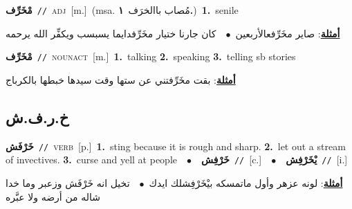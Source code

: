 \documentclass[10pt,a4paper,twoside]{article} %
\begin{document}
\begin{multicols}{2}
{\setlength\topsep{0pt}\textbf{\foreignlanguage{arabic}{مْخَرِّف}}\ {\color{gray}\texttt{//}\color{black}}\ \textsc{adj}\ [m.]\ \color{gray}(msa. \foreignlanguage{arabic}{مُصاب باالخرَف}~\foreignlanguage{arabic}{\textbf{١.}})\color{black}\ \textbf{1.}~senile\  \begin{flushright}\color{gray}\foreignlanguage{arabic}{\textbf{\underline{\foreignlanguage{arabic}{أمثلة}}}: صاير مخَرِّفعالأربعين\ $\bullet$\ \  كان جارنا ختيار مخَرِّفدايما يسبسب ويكفِّر الله يرحمه}\end{flushright}\color{black}} \vspace{2mm}

{\setlength\topsep{0pt}\textbf{\foreignlanguage{arabic}{مْخَرِّف}}\ {\color{gray}\texttt{//}\color{black}}\ \textsc{noun\textunderscore act}\ [m.]\ \textbf{1.}~talking  \textbf{2.}~speaking  \textbf{3.}~telling sb stories\  \begin{flushright}\color{gray}\foreignlanguage{arabic}{\textbf{\underline{\foreignlanguage{arabic}{أمثلة}}}: بقت مخَرِّفتني عن ستها وقت سيدها خبطها بالكرباج}\end{flushright}\color{black}} \vspace{2mm}

\vspace{-3mm}
\subsection*{\color{blue}\foreignlanguage{arabic}{خ.ر.ف.ش}\color{blue}{}} 

{\setlength\topsep{0pt}\textbf{\foreignlanguage{arabic}{خَرْفَش}}\ {\color{gray}\texttt{//}\color{black}}\ \textsc{verb}\ [p.]\ \textbf{1.}~sting because it is rough and sharp.  \textbf{2.}~let out a stream of invectives.  \textbf{3.}~curse and yell at people\ \ $\bullet$\ \ \setlength\topsep{0pt}\textbf{\foreignlanguage{arabic}{خَرْفِش}}\ {\color{gray}\texttt{//}\color{black}}\ [c.]\ \ $\bullet$\ \ \setlength\topsep{0pt}\textbf{\foreignlanguage{arabic}{يْخَرْفِش}}\ {\color{gray}\texttt{//}\color{black}}\ [i.]\  \begin{flushright}\color{gray}\foreignlanguage{arabic}{\textbf{\underline{\foreignlanguage{arabic}{أمثلة}}}: لونه عزهر وأول ماتمسكه بيْخَرْفِشلك ايدك\ $\bullet$\ \  تخيل انه خَرْفَش وزعبر وما خدا شاله من أرضه ولا عبَّره}\end{flushright}\color{black}} \vspace{2mm}


\end{multicols}
\end{document}
